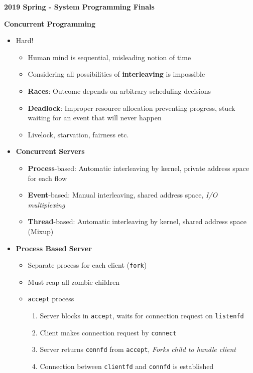\documentclass[12pt]{article}
\newcommand{\cname}[1]{\large \textbf{#1}}
\begin{document}
{\sffamily
		\begin{center}
			\textbf{\large 2019 Spring - System Programming Finals}
		\end{center}
		\cname{Concurrent Programming}
		\begin{itemize}
			\item Hard!
			\begin{itemize}
				\item Human mind is sequential, misleading notion of time
				\item Considering all possibilities of \textbf{interleaving} is impossible
				\item \textbf{Races}: Outcome depends on arbitrary scheduling decisions
				\item \textbf{Deadlock}: Improper resource allocation preventing progress, stuck waiting for an event that will never happen
				\item Livelock, starvation, fairness etc.
			\end{itemize}
			\item \textbf{Concurrent Servers}
			\begin{itemize}
				\item \textbf{Process}-based: Automatic interleaving by kernel, private address space for each flow
				\item \textbf{Event}-based: Manual interleaving, shared address space, \textit{I/O multiplexing}
				\item \textbf{Thread}-based: Automatic interleaving by kernel, shared address space (Mixup)
			\end{itemize}
			\item \textbf{Process Based Server}
			\begin{itemize}
				\item Separate process for each client (\texttt{fork})
				\item Must reap all zombie children
				\item \texttt{accept} process
				\begin{enumerate}
					\item Server blocks in \texttt{accept}, waits for connection request on \texttt{listenfd}
					\item Client makes connection request by \texttt{connect}
					\item Server returns \texttt{connfd} from \texttt{accept}, \textit{Forks child to handle client}
					\item Connection between \texttt{clientfd} and \texttt{connfd} is established  

\end{enumerate}
\end{itemize}
\end{itemize}}
\end{document}
